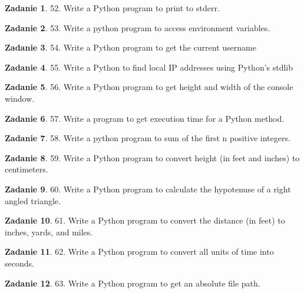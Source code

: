 \documentclass[11pt]{article}
\theoremstyle{definition}
\newtheorem{zadanie}{Zadanie}
\begin{document}
\begin{zadanie}
52. Write a Python program to print to stderr.
\end{zadanie}

\begin{zadanie}
53. Write a python program to access environment variables.
\end{zadanie}

\begin{zadanie}
54. Write a Python program to get the current username
\end{zadanie}

\begin{zadanie}
55. Write a Python to find local IP addresses using Python's stdlib
\end{zadanie}

\begin{zadanie}
56. Write a Python program to get height and width of the console window.
\end{zadanie}

\begin{zadanie}
57. Write a program to get execution time for a Python method.
\end{zadanie}

\begin{zadanie}
58. Write a python program to sum of the first n positive integers.
\end{zadanie}

\begin{zadanie}
59. Write a Python program to convert height (in feet and inches) to centimeters.
\end{zadanie}

\begin{zadanie}
60. Write a Python program to calculate the hypotenuse of a right angled triangle.
\end{zadanie}

\begin{zadanie}
61. Write a Python program to convert the distance (in feet) to inches, yards, and miles.
\end{zadanie}

\begin{zadanie}
62. Write a Python program to convert all units of time into seconds.
\end{zadanie}

\begin{zadanie}
63. Write a Python program to get an absolute file path.
\end{zadanie}
\end{document}
